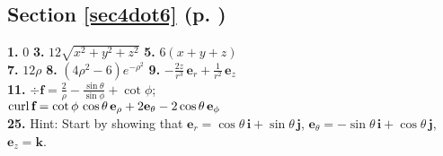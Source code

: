 \begin{multicols}{2}
\subsection*{Section \ref{sec4dot6} (p. \pageref{sec4dot6})}
\textbf{1.} $0$\quad
\textbf{3.} $12\sqrt{x^2 + y^2 + z^2}$\quad
\textbf{5.} $6(x+y+z)$\\
\textbf{7.} $12\rho$ \quad
\textbf{8.} $(4\rho^2 -6)e^{-\rho^2}$ \quad
\textbf{9.} $-\frac{2z}{r^3}\,\textbf{e}_{r} + \frac{1}{r^2}\,\textbf{e}_{z}$\\
\textbf{11.} $\div\textbf{f} = \frac{2}{\rho} - \frac{\sin\theta}{\sin\phi} + \cot\phi$;\\$\mathop{\mathrm{curl}}\nolimits\textbf{f}
= \cot\phi\,\cos\theta\,\textbf{e}_{\rho} + 2\textbf{e}_{\theta} -2\cos\theta\,\textbf{e}_{\phi}$\\
\textbf{25.} Hint: Start by showing that $\textbf{e}_{r} = \cos\theta\,\textbf{i} + \sin\theta\,\textbf{j}$,
$\textbf{e}_{\theta} = -\sin\theta\,\textbf{i} + \cos\theta\,\textbf{j}$, $\textbf{e}_{z} = \textbf{k}$.
\end{multicols}
